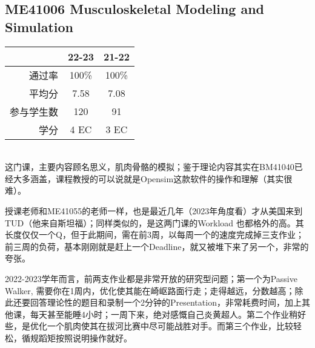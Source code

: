 \subsection{ME41006 Musculoskeletal Modeling and Simulation}\hypertarget{ME41006}{} 
\begin{minipage}{0.45\textwidth}
\centering
{}
\end{minipage}%
\begin{minipage}{0.45\textwidth}
\raggedleft
\begin{tabular}{r|c|c}
\textbf{ } & \textbf{22-23} & \textbf{21-22}\\ \hline
通过率 & 100\% & 100\%\\ 
平均分 & 7.58  & 7.08\\ 
参与学生数 & 120 & 91\\
学分 & 4 EC & 3 EC\\
\end{tabular}
\end{minipage}\\

这门课，主要内容顾名思义，肌肉骨骼的模拟；鉴于理论内容其实在BM41040已经大多涵盖，课程教授的可以说就是Opensim这款软件的操作和理解（其实很难）。

授课老师和ME41055的老师一样，也是最近几年（2023年角度看）才从美国来到TUD（他来自斯坦福）；同样类似的，是这两门课的Workload 也都格外的高。其长度仅仅一个Q，但于此期间，需在前3周，以每周一个的速度完成掉三支作业；前三周的负荷，基本刚刚就是赶上一个Deadline，就又被堆下来了另一个，非常的夸张。

2022-2023学年而言，前两支作业都是非常开放的研究型问题；第一个为Passive Walker, 需要你在1周内，优化使其能在崎岖路面行走；走得越远，分数越高；除此还要回答理论性的题目和录制一个2分钟的Presentation，非常耗费时间，加上其他课，每天甚至能睡4小时；一周下来，绝对感慨自己炎黄超人。第二个作业稍好些，是优化一个肌肉使其在拔河比赛中尽可能战胜对手。而第三个作业，比较轻松，循规蹈矩按照说明操作就好。

